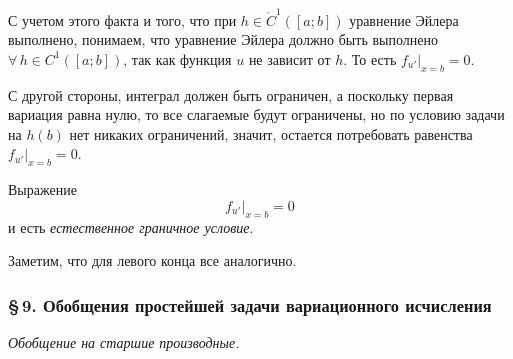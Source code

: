 \documentclass[12pt,a5paper]{book}
\begin{document}
	С учетом этого факта и того, что при $h \in \mathring{C}^1([a;b])$ уравнение Эйлера выполнено, понимаем, что уравнение Эйлера должно быть выполнено $\forall\,h \in C^1([a;b])$, так как функция $u$ не зависит от $h$. То есть $f_{u'}|_{x=b} = 0$.
	
	С другой стороны, интеграл должен быть ограничен, а поскольку первая вариация равна нулю, то все слагаемые будут ограничены, но по условию задачи на $h(b)$ нет никаких ограничений, значит, остается потребовать равенства $f_{u'}|_{x=b} = 0$.
	
	Выражение
	\begin{equation*}
		\left.f_{u'}\right|_{x=b} = 0
	\end{equation*}
	и есть \emph{естественное граничное условие}.
	
	Заметим, что для левого конца все аналогично.
	
	\subsubsection*{\S\,9. Обобщения простейшей задачи вариационного исчисления}
	
	\emph{Обобщение на старшие производные.}
\end{document}
